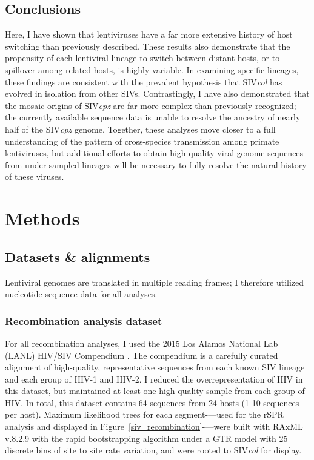 \subsection{Conclusions}
Here, I have shown that lentiviruses have a far more extensive history of host switching than previously described.
These results also demonstrate that the propensity of each lentiviral lineage to switch between distant hosts, or to spillover among related hosts, is highly variable.
In examining specific lineages, these findings are consistent with the prevalent hypothesis that SIV\textit{col} has evolved in isolation from other SIVs.
Contrastingly, I have also demonstrated that the mosaic origins of SIV\textit{cpz} are far more complex than previously recognized; the currently available sequence data is unable to resolve the ancestry of nearly half of the SIV\textit{cpz} genome.
Together, these analyses move closer to a full understanding of the pattern of cross-species transmission among primate lentiviruses, but additional efforts to obtain high quality viral genome sequences from under sampled lineages will be necessary to fully resolve the natural history of these viruses.

\clearpage
\section{Methods}
\subsection*{Datasets \& alignments}
Lentiviral genomes are translated in multiple reading frames; I therefore utilized nucleotide sequence data for all analyses.

\subsubsection*{Recombination analysis dataset}
For all recombination analyses, I used the 2015 Los Alamos National Lab (LANL) HIV/SIV Compendium \citep{los2012hiv}.
The compendium is a carefully curated alignment of high-quality, representative sequences from each known SIV lineage and each group of HIV-1 and HIV-2.
I reduced the overrepresentation of HIV in this dataset, but maintained at least one high quality sample from each group of HIV.
In total, this dataset contains 64 sequences from 24 hosts (1-10 sequences per host).
Maximum likelihood trees for each segment-—used for the rSPR analysis and displayed in Figure~\ref{siv_recombination}-—were built with RAxML v.8.2.9 \citep{stamatakis2014raxml} with the rapid bootstrapping algorithm under a GTR model with 25 discrete bins of site to site rate variation, and were rooted to SIV\textit{col} for display.

